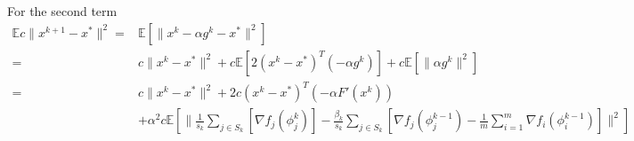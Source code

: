 \documentclass[11pt]{article}
\begin{document}
For the second term
\begin{align*}
	\mathbb{E} c \|x^{k+1} - x^* \|^2  =& \mathbb{E} \left[  \|x^k - \alpha g^k - x^* \|^2 \right] \\
	=&  c\|x^k - x^* \|^2  +  c\mathbb{E} \left[ 2 (x^k - x^* )^T (- \alpha g^k) \right]  +  c\mathbb{E} \left[  \|\alpha g^k \|^2 \right] \\
	=&  c\|x^k - x^* \|^2  + 2 c(x^k - x^* )^T (- \alpha  F'(x^k)) \\
	&+ \alpha^2 c\mathbb{E} \left[  \|\frac{1}{s_k} \sum_{j \in S_k} \left[  \nabla f_j(\phi_j^{k}) \right]- \frac{ \beta_k }{s_k} \sum_{j \in S_k} \left[  \nabla f_j(\phi^{k-1}_j) - \frac{1}{m} \sum_{i = 1}^{m }  \nabla f_i (\phi_i^{k-1}) \right]  \|^2 \right] \\
\end{align*}
\end{document}
